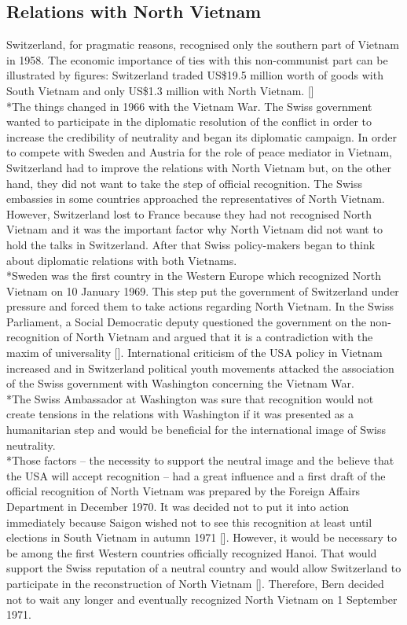 \documentclass[a4paper]{article}
\begin{document}
\subsection{Relations with North Vietnam}
Switzerland, for pragmatic reasons, recognised only the southern part of Vietnam in 1958. The economic importance of ties with this non-communist part can be illustrated by figures: Switzerland traded US\$19.5 million worth of goods with South Vietnam and only US\$1.3 million with North Vietnam. []
\\*The things changed in 1966 with the Vietnam War. The Swiss government wanted to participate in the diplomatic resolution of the conflict in order to increase the credibility of neutrality and began its diplomatic campaign. In order to compete with Sweden and Austria for the role of peace mediator in Vietnam, Switzerland had to improve the relations with North Vietnam but, on the other hand, they did not want to take the step of official recognition. The Swiss embassies in some countries approached the representatives of North Vietnam. However, Switzerland lost to France because they had not recognised North Vietnam and it was the important factor why North Vietnam did not want to hold the talks in Switzerland. After that Swiss policy-makers began to think about diplomatic relations with both Vietnams.
\\*Sweden was the first country in the Western Europe which recognized North Vietnam on 10 January 1969. This step put the government of Switzerland under pressure and forced them to take actions regarding North Vietnam. In the Swiss Parliament, a Social Democratic deputy questioned the government on the non-recognition of North Vietnam and argued that it is a contradiction with the maxim of universality []. International criticism of the USA policy in Vietnam increased and in Switzerland political youth movements attacked the association of the Swiss government with Washington concerning the Vietnam War.
\\*The Swiss Ambassador at Washington was sure that recognition would not create tensions in the relations with Washington if it was presented as a humanitarian step and would be beneficial for the international image of Swiss neutrality.
\\*Those factors – the necessity to support the neutral image and the believe that the USA will accept recognition – had a great influence and a first draft of the official recognition of North Vietnam was prepared by the Foreign Affairs Department in December 1970. It was decided not to put it into action immediately because Saigon wished not to see this recognition at least until elections in South Vietnam in autumn 1971 []. However, it would be necessary to be among the first Western countries officially recognized Hanoi. That would support the Swiss reputation of a neutral country and would allow Switzerland to participate in the  reconstruction of North Vietnam []. Therefore, Bern decided not to wait any longer and eventually recognized North Vietnam on 1 September 1971.
\end{document}
